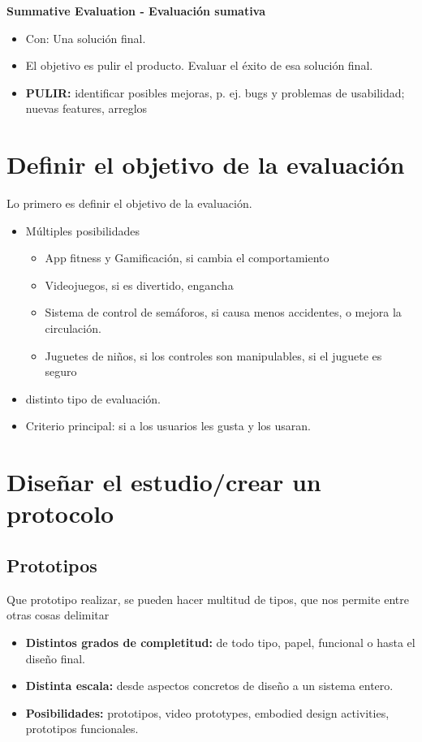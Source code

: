\documentclass[12pt, twoside, openright]{report} %
\begin{document}
\textbf{Summative Evaluation - Evaluación sumativa}
\begin{itemize}
	\item Con: Una solución final.
	\item El objetivo es pulir el producto. Evaluar el éxito de esa solución final.
	\item \textbf{PULIR:} identificar posibles mejoras, p. ej. bugs y problemas de usabilidad; nuevas features, arreglos
\end{itemize}

\section{Definir el objetivo de la evaluación}
Lo primero es definir el objetivo de la evaluación.
\begin{itemize}
	\item Múltiples posibilidades
	      \begin{itemize}
		      \item App fitness y Gamificación, si cambia el comportamiento
		      \item Videojuegos, si es divertido, engancha
		      \item Sistema de control de semáforos, si causa menos accidentes, o mejora la circulación.
		      \item Juguetes de niños, si los controles son manipulables, si el juguete es seguro
	      \end{itemize}
	\item distinto tipo de evaluación.
	\item Criterio principal: si a los usuarios les gusta y los usaran.
\end{itemize}

\section{Diseñar el estudio/crear un protocolo}
\subsection{Prototipos}
Que prototipo realizar, se pueden hacer multitud de tipos, que nos permite entre otras cosas delimitar
\begin{itemize}
	\item \textbf{Distintos grados de completitud:} de todo tipo, papel, funcional o hasta el diseño final.
	\item \textbf{Distinta escala:} desde aspectos concretos de diseño a un sistema entero.
	\item \textbf{Posibilidades:} prototipos, video prototypes, embodied design activities, prototipos funcionales.
\end{itemize}
\end{document}
